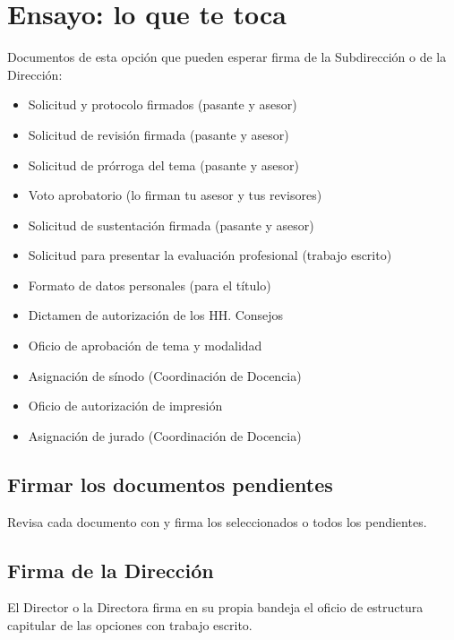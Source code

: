 \section{Ensayo: lo que te toca}
Documentos de esta opción que pueden esperar firma de la Subdirección o de la Dirección:
\begin{itemize}
  \item Solicitud y protocolo firmados (pasante y asesor)
  \item Solicitud de revisión firmada (pasante y asesor)
  \item Solicitud de prórroga del tema (pasante y asesor)
  \item Voto aprobatorio (lo firman tu asesor y tus revisores)
  \item Solicitud de sustentación firmada (pasante y asesor)
  \item Solicitud para presentar la evaluación profesional (trabajo escrito)
  \item Formato de datos personales (para el título)
  \item Dictamen de autorización de los HH. Consejos
  \item Oficio de aprobación de tema y modalidad
  \item Asignación de sínodo (Coordinación de Docencia)
  \item Oficio de autorización de impresión
  \item Asignación de jurado (Coordinación de Docencia)
\end{itemize}
\subsection{Firmar los documentos pendientes}
Revisa cada documento con  y firma los seleccionados o todos los pendientes.
\subsection{Firma de la Dirección}
El Director o la Directora firma en su propia bandeja el oficio de estructura capitular de las opciones con trabajo escrito.
